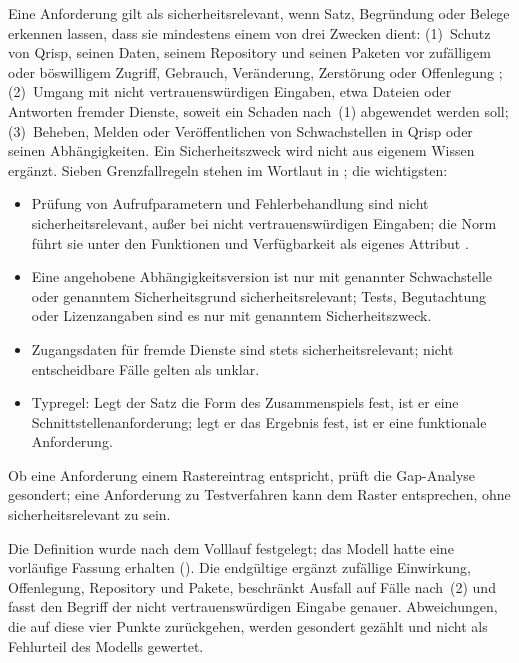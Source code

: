 \documentclass[11pt,a4paper]{report}
\begin{document}
Eine Anforderung gilt als sicherheitsrelevant, wenn Satz, Begründung
oder Belege erkennen lassen, dass sie mindestens einem von drei Zwecken
dient: (1)~Schutz von Qrisp, seinen Daten, seinem Repository und seinen
Paketen vor zufälligem oder böswilligem Zugriff, Gebrauch, Veränderung,
Zerstörung oder Offenlegung \cite[Abschn.~9.6.18\,c]{iso29148};
(2)~Umgang mit nicht vertrauenswürdigen Eingaben, etwa Dateien oder
Antworten fremder Dienste, soweit ein Schaden nach~(1) abgewendet werden
soll; (3)~Beheben, Melden oder Veröffentlichen von Schwachstellen in
Qrisp oder seinen Abhängigkeiten. Ein Sicherheitszweck wird nicht aus
eigenem Wissen ergänzt. Sieben Grenzfallregeln stehen im Wortlaut in
; die wichtigsten:

\begin{itemize}
  \item Prüfung von Aufrufparametern und Fehlerbehandlung sind nicht
    sicherheitsrelevant, außer bei nicht vertrauenswürdigen Eingaben;
    die Norm führt sie unter den Funktionen und Verfügbarkeit als
    eigenes Attribut \cite[Abschn.~9.6.12\,a, 9.6.12\,c,
    9.6.18\,b]{iso29148}.
  \item Eine angehobene Abhängigkeitsversion ist nur mit genannter
    Schwachstelle oder genanntem Sicherheitsgrund sicherheitsrelevant;
    Tests, Begutachtung oder Lizenzangaben sind es nur mit genanntem
    Sicherheitszweck.
  \item Zugangsdaten für fremde Dienste sind stets
    sicherheitsrelevant; nicht entscheidbare Fälle gelten als unklar.
  \item Typregel: Legt der Satz die Form des Zusammenspiels fest, ist er
    eine Schnittstellenanforderung; legt er das Ergebnis fest, ist er
    eine funktionale Anforderung.
\end{itemize}

Ob eine Anforderung einem Rastereintrag entspricht, prüft die
Gap-Analyse gesondert; eine Anforderung zu Testverfahren kann dem
Raster entsprechen, ohne sicherheitsrelevant zu sein.

Die Definition wurde nach dem Volllauf festgelegt; das Modell hatte eine
vorläufige Fassung erhalten ().
Die endgültige ergänzt zufällige Einwirkung, Offenlegung, Repository
und Pakete, beschränkt Ausfall auf Fälle nach~(2) und fasst den Begriff
der nicht vertrauenswürdigen Eingabe genauer. Abweichungen, die auf
diese vier Punkte zurückgehen, werden gesondert gezählt und nicht als
Fehlurteil des Modells gewertet.
\end{document}
